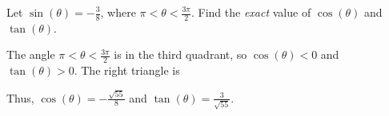 \question[3]
Let $\sin(\theta) = -\frac{3}{8}$, where $\pi < \theta < \frac{3\pi}{2}$. Find the \emph{exact} value of $\cos(\theta)$ and $\tan(\theta)$.

\begin{EnvFullwidth}
\begin{solutionorgrid}[2in]
The angle $\pi < \theta < \frac{3\pi}{2}$ is in the third quadrant, so $\cos(\theta) < 0$ and $\tan(\theta) > 0$. The right triangle is
\begin{center}
\end{center}
Thus, $\cos(\theta) = -\frac{\sqrt{55}}{8}$ and $\tan(\theta) = \frac{3}{\sqrt{55}}$.
\end{solutionorgrid}
\end{EnvFullwidth}
